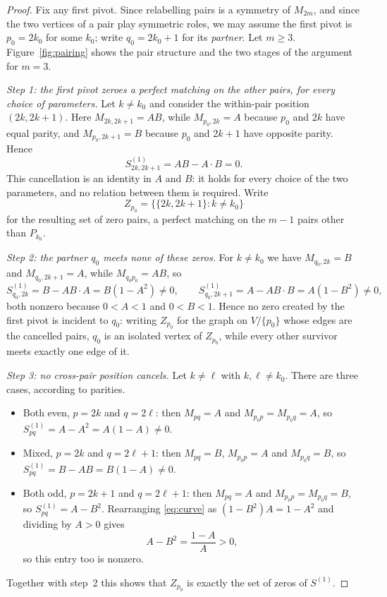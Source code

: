 \documentclass[11pt]{article}
\theoremstyle{plain}
\theoremstyle{definition}
\begin{document}
\begin{aiblock}
\begin{proof}
Fix any first pivot. Since relabelling pairs is a symmetry of $M_{2m}$, and since the two vertices of
a pair play symmetric roles, we may assume the first pivot is $p_0=2k_0$ for some $k_0$; write
$q_0=2k_0+1$ for its \emph{partner}. Let $m\ge3$. Figure~\ref{fig:pairing} shows the pair structure
and the two stages of the argument for $m=3$.

\emph{Step 1: the first pivot zeroes a perfect matching on the other pairs, for every choice of
parameters.} Let $k\neq k_0$ and consider the within-pair position $(2k,2k+1)$. Here
$M_{2k,2k+1}=AB$, while $M_{p_0,2k}=A$ because $p_0$ and $2k$ have equal parity, and
$M_{p_0,2k+1}=B$ because $p_0$ and $2k+1$ have opposite parity. Hence
\[
S^{(1)}_{2k,2k+1}=AB-A\cdot B=0 .
\]
This cancellation is an identity in $A$ and $B$: it holds for every choice of the two parameters, and
no relation between them is required. Write
\[
Z_{p_0}=\bigl\{\{2k,2k+1\}: k\neq k_0\bigr\}
\]
for the resulting set of zero pairs, a perfect matching on the $m-1$ pairs other than $P_{k_0}$.

\emph{Step 2: the partner $q_0$ meets none of these zeros.} For $k\neq k_0$ we have
$M_{q_0,2k}=B$ and $M_{q_0,2k+1}=A$, while $M_{q_0p_0}=AB$, so
\[
S^{(1)}_{q_0,2k}=B-AB\cdot A=B(1-A^2)\neq0,
\qquad
S^{(1)}_{q_0,2k+1}=A-AB\cdot B=A(1-B^2)\neq0,
\]
both nonzero because $0<A<1$ and $0<B<1$. Hence no zero created by the first pivot is incident to $q_0$: writing $Z_{p_0}$ for the graph on $V\slash \{p_0\}$ whose edges are the cancelled pairs, $q_0$ is an isolated vertex of $Z_{p_0}$, while every other survivor meets exactly one edge of it.


\emph{Step 3: no cross-pair position cancels.} Let $k\neq\ell$ with $k,\ell\neq k_0$. There are three
cases, according to parities.
\begin{itemize}
\item Both even, $p=2k$ and $q=2\ell$: then $M_{pq}=A$ and $M_{p_0p}=M_{p_0q}=A$, so
      $S^{(1)}_{pq}=A-A^2=A(1-A)\neq0$.
\item Mixed, $p=2k$ and $q=2\ell+1$: then $M_{pq}=B$, $M_{p_0p}=A$ and $M_{p_0q}=B$, so
      $S^{(1)}_{pq}=B-AB=B(1-A)\neq0$.
\item Both odd, $p=2k+1$ and $q=2\ell+1$: then $M_{pq}=A$ and $M_{p_0p}=M_{p_0q}=B$, so
      $S^{(1)}_{pq}=A-B^2$. Rearranging \eqref{eq:curve} as $(1-B^2)A=1-A^2$ and dividing by $A>0$
      gives
      \[
      A-B^2=\frac{1-A}{A}>0 ,
      \]
      so this entry too is nonzero.
\end{itemize}
Together with step~2 this shows that $Z_{p_0}$ is exactly the set of zeros of $S^{(1)}$.


\end{proof}
\end{aiblock}
\end{document}
